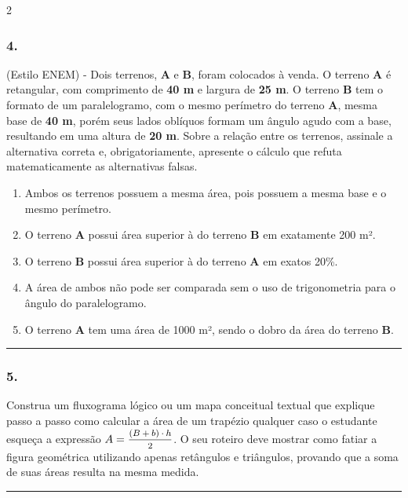 \documentclass[twoside, 10pt, a4paper]{article}
\newlength{\espacoPreQuestao}\setlength{\espacoPreQuestao}{0.1cm}
\newlength{\espacoQuestao}\setlength{\espacoQuestao}{0.2cm}
\newlength{\espacoAlt}\setlength{\espacoAlt}{0.2cm}
\begin{document}
\begin{multicols*}{2}
\subsubsection*{4.} (Estilo ENEM) - Dois terrenos, \textbf{A} e \textbf{B}, foram colocados à venda. O terreno \textbf{A} é retangular, com comprimento de \textbf{40 m} e largura de \textbf{25 m}. O terreno \textbf{B} tem o formato de um paralelogramo, com o mesmo perímetro do terreno \textbf{A}, mesma base de \textbf{40 m}, porém seus lados oblíquos formam um ângulo agudo com a base, resultando em uma altura de \textbf{20 m}. Sobre a relação entre os terrenos, assinale a alternativa correta e, obrigatoriamente, apresente o cálculo que refuta matematicamente as alternativas falsas.
\begin{enumerate}[label=\alph*), itemsep=\espacoAlt]
\item Ambos os terrenos possuem a mesma área, pois possuem a mesma base e o mesmo perímetro.
\item O terreno \textbf{A} possui área superior à do terreno \textbf{B} em exatamente 200 m².
\item O terreno \textbf{B} possui área superior à do terreno \textbf{A} em exatos 20\%.
\item A área de ambos não pode ser comparada sem o uso de trigonometria para o ângulo do paralelogramo.
\item O terreno \textbf{A} tem uma área de 1000 m², sendo o dobro da área do terreno \textbf{B}.
\end{enumerate}
\par\vspace{\espacoQuestao}

\noindent\textcolor{CorLinha}{\rule{\linewidth}{0.5pt}} 
\par\vspace{\espacoPreQuestao}
\subsubsection*{5.} Construa um fluxograma lógico ou um mapa conceitual textual que explique passo a passo como calcular a área de um trapézio qualquer caso o estudante esqueça a expressão $A = \mfrac{(B+b) \cdot h}{2}$. O seu roteiro deve mostrar como fatiar a figura geométrica utilizando apenas retângulos e triângulos, provando que a soma de suas áreas resulta na mesma medida.
\par\vspace{\espacoQuestao}

\noindent\textcolor{CorLinha}{\rule{\linewidth}{0.5pt}} 
\par\vspace{\espacoPreQuestao}

\end{multicols*}
\end{document}
